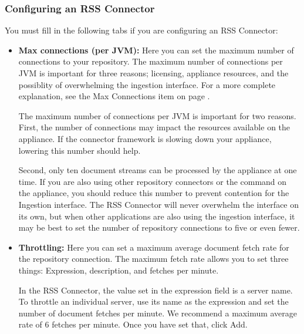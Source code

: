 %
%

\subsubsection{Configuring an RSS Connector}

You must fill in the following tabs if you are configuring an RSS
Connector:


\begin{itemize}

\item \textbf{Max connections (per JVM):} Here you can set the maximum
number of connections to your repository.  \ifCombinedConnectorGuide
The maximum number of connections per JVM is important for three
reasons; licensing, appliance resources, and the possiblity of
overwhelming the ingestion interface. For a more complete explanation,
see the Max Connections item on page \pageref{maxrepocon}.\fi

\ifJDBCGuide
The maximum number of connections per JVM is important for two reasons.
First, the number of connections may impact the resources
available on the appliance. If the connector framework is slowing down
your appliance, lowering this number should help.

Second, only ten document streams can be processed by the appliance
at one time.  If you are also using other repository connectors or
the  command on the appliance, you should reduce this
number to prevent contention for the Ingestion interface. The RSS
Connector will never overwhelm the interface on its own, but when other
applications are also using the ingestion interface, it may be best to
set the number of repository connections to five or even fewer.
\fi


\item \textbf{Throttling:} Here you can set a maximum average document fetch
rate for the repository connection. The maximum fetch rate allows you
to set three things: Expression, description, and fetches per minute.

In the RSS Connector, the value set in the expression field is a
server name. To throttle an individual server, use its name as the
expression and set the number of document fetches per minute. We
recommend a maximum average rate of 6 fetches per minute.  Once you
have set that, click Add.
\end{itemize}

